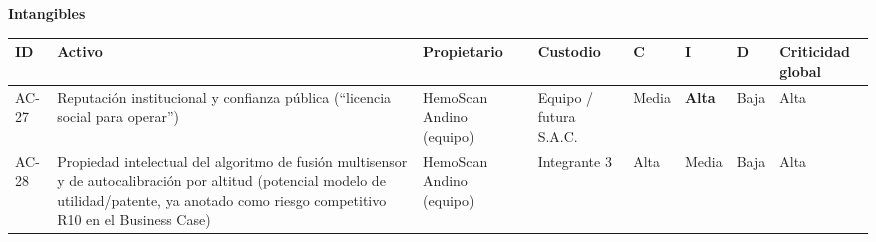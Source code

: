 \documentclass[11pt,a4paper]{article}
\begin{document}
\textbf{Intangibles}

{\small
\begin{longtable}[]{@{}
  >{\raggedright\arraybackslash}p{}
  >{\raggedright\arraybackslash}p{}
  >{\raggedright\arraybackslash}p{}
  >{\raggedright\arraybackslash}p{}
  >{\raggedright\arraybackslash}p{}
  >{\raggedright\arraybackslash}p{}
  >{\raggedright\arraybackslash}p{}
  >{\raggedright\arraybackslash}p{}@{}}
\toprule\noalign{}
\begin{minipage}[b]{\linewidth}\raggedright
ID
\end{minipage} & \begin{minipage}[b]{\linewidth}\raggedright
Activo
\end{minipage} & \begin{minipage}[b]{\linewidth}\raggedright
Propietario
\end{minipage} & \begin{minipage}[b]{\linewidth}\raggedright
Custodio
\end{minipage} & \begin{minipage}[b]{\linewidth}\raggedright
C
\end{minipage} & \begin{minipage}[b]{\linewidth}\raggedright
I
\end{minipage} & \begin{minipage}[b]{\linewidth}\raggedright
D
\end{minipage} & \begin{minipage}[b]{\linewidth}\raggedright
Criticidad global
\end{minipage} \\
\midrule\noalign{}
\endhead
\bottomrule\noalign{}
\endlastfoot
AC-27 & Reputación institucional y confianza pública (``licencia social para operar'') & HemoScan Andino (equipo) & Equipo / futura S.A.C. & Media & \textbf{Alta} & Baja & Alta \\
AC-28 & Propiedad intelectual del algoritmo de fusión multisensor y de autocalibración por altitud (potencial modelo de utilidad/patente, ya anotado como riesgo competitivo R10 en el Business Case) & HemoScan Andino (equipo) & Integrante 3 & Alta & Media & Baja & Alta \\
\end{longtable}
}
\end{document}
